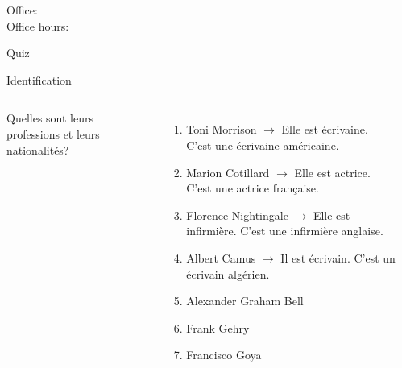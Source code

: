 \documentclass{beamer}
\subtitle[\lexi{C'est} et \lexi{il est}]{\lexi{C'est} et \lexi{il est}}
\begin{document}
  \begin{frame}
    \titlepage
    \tiny{Office: \\
          Office hours: }
  \end{frame}

  \begin{frame}{}
    \begin{center}
      \Large Quiz
    \end{center}
  \end{frame}

  \begin{frame}{Identification}
    \begin{columns}
        {\scriptsize
        Quelles sont leurs professions et leurs nationalités?
        \begin{enumerate}
          \item Toni Morrison
           {$\to$ Elle est écrivaine. C'est une écrivaine américaine.}
          \item<3-> Marion Cotillard
           {$\to$ Elle est actrice. C'est une actrice française.}
          \item<5-> Florence Nightingale
           {$\to$ Elle est infirmière. C'est une infirmière anglaise.}
          \item<7-> Albert Camus
           {$\to$ Il est écrivain. C'est un écrivain algérien.}
          \item<9-> Alexander Graham Bell
          \item<11-> Frank Gehry
          \item<13-> Francisco Goya
        \end{enumerate}
        }
        \begin{minipage}[c][0.6\textheight]{\linewidth}
          \begin{center}
\end{center}
\end{minipage}
\end{columns}
\end{frame}
\end{document}
